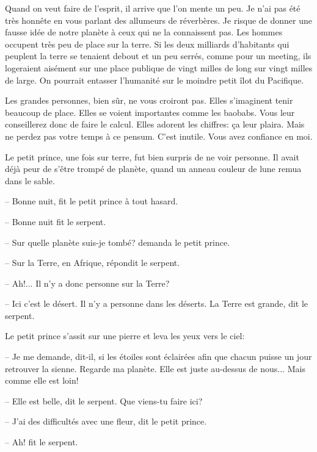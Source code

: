 \documentclass[a4paper]{report}
\begin{document}

\parachapter[XVII]{} %
Quand on veut faire de l'esprit, il arrive que l'on mente un peu. Je n'ai pas été très honnête en vous parlant des allumeurs de réverbères. Je risque de donner une fausse idée de notre planète à ceux qui ne la connaissent pas. Les hommes occupent très peu de place sur la terre. Si les deux milliards d'habitants qui peuplent la terre se tenaient debout et un peu serrés, comme pour un meeting,  ils logeraient aisément sur une place publique de vingt milles de long sur vingt milles de large. On pourrait entasser l'humanité sur le moindre petit îlot du Pacifique.

Les grandes personnes, bien sûr, ne vous croiront pas. Elles s'imaginent tenir beaucoup de place. Elles se voient importantes comme les baobabs. Vous leur conseillerez donc de faire le calcul. Elles adorent les chiffres: ça leur plaira. Mais ne perdez pas votre temps à ce pensum. C'est inutile. Vous avez confiance en moi.

Le petit prince, une fois sur terre, fut bien surpris de ne voir personne. Il avait déjà peur de s'être trompé de planète, quand un anneau couleur de lune remua dans le sable.

-- Bonne nuit, fit le petit prince à tout hasard.

-- Bonne nuit fit le serpent.

-- Sur quelle planète suis-je tombé? demanda le petit prince.

-- Sur la Terre, en Afrique, répondit le serpent.

-- Ah!... Il n'y a donc personne sur la Terre?

-- Ici c'est le désert. Il n'y a personne dans les déserts. La Terre est grande, dit le serpent.

Le petit prince s'assit sur une pierre et leva les yeux vers le ciel:

-- Je me demande, dit-il, si les étoiles sont éclairées afin que chacun puisse un jour retrouver la sienne. Regarde ma planète. Elle est juste au-dessus de nous... Mais comme elle est loin!

-- Elle est belle, dit le serpent. Que viens-tu faire ici?

-- J'ai des difficultés avec une fleur, dit le petit prince.

-- Ah! fit le serpent.
\end{document}
